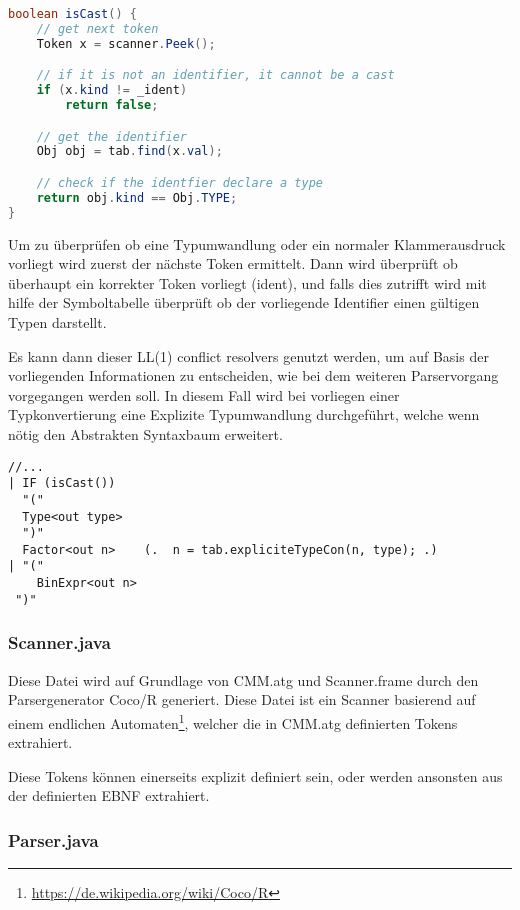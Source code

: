 \begin{lstlisting}[language=Java]
boolean isCast() {
	// get next token
	Token x = scanner.Peek();

	// if it is not an identifier, it cannot be a cast
	if (x.kind != _ident) 
		return false;

	// get the identifier
	Obj obj = tab.find(x.val);

	// check if the identfier declare a type
	return obj.kind == Obj.TYPE;
}
\end{lstlisting}

Um zu \"uberpr\"ufen ob eine Typumwandlung oder ein normaler Klammerausdruck vorliegt wird zuerst der n\"achste Token ermittelt. Dann wird \"uberpr\"uft ob \"uberhaupt ein korrekter Token vorliegt (ident), und falls dies zutrifft wird mit hilfe der Symboltabelle \"uberpr\"uft ob der vorliegende Identifier einen g\"ultigen Typen darstellt.

Es kann dann dieser LL(1) conflict resolvers genutzt werden, um auf Basis der vorliegenden Informationen zu entscheiden, wie bei dem weiteren Parservorgang vorgegangen werden soll. In diesem Fall wird bei vorliegen einer Typkonvertierung eine Explizite Typumwandlung durchgef\"uhrt, welche wenn n\"otig den Abstrakten Syntaxbaum erweitert.

\begin{lstlisting}[language=EBNF]
//...
| IF (isCast())                        
  "(" 
  Type<out type>
  ")"
  Factor<out n>    (.  n = tab.expliciteTypeCon(n, type); .)
| "("
    BinExpr<out n>
 ")"
\end{lstlisting}

\subsubsection{Scanner.java}

Diese Datei wird auf Grundlage von CMM.atg und Scanner.frame durch den Parsergenerator Coco/R generiert. Diese Datei ist ein Scanner basierend auf einem endlichen Automaten\footnote{\url{https://de.wikipedia.org/wiki/Coco/R}}, welcher die in CMM.atg definierten Tokens extrahiert.

Diese Tokens k\"onnen einerseits explizit definiert sein, oder werden ansonsten aus der definierten EBNF extrahiert.

\subsubsection{Parser.java}

